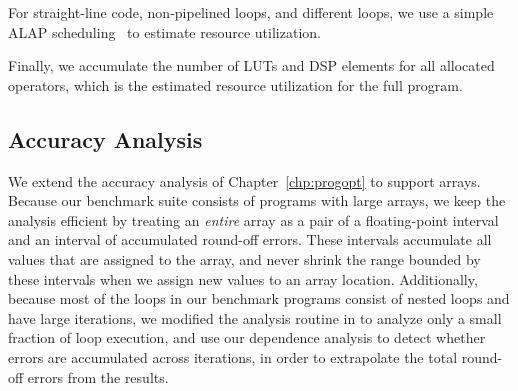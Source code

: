 For straight-line code, non-pipelined loops, and different loops, we use a
simple ALAP scheduling~\cite{wang_hls} to estimate resource utilization.

Finally, we accumulate the number of LUTs and DSP elements for all allocated
operators, which is the estimated resource utilization for the full program.


\subsection{Accuracy Analysis}
\label{sub:accuracy_analysis}

We extend the accuracy analysis of Chapter~\ref{chp:progopt} to support
arrays. Because our benchmark suite consists of programs with large arrays,
we keep the analysis efficient by treating an \emph{entire} array as a pair
of a floating-point interval and an interval of accumulated round-off errors.
These intervals accumulate all values that are assigned to the array, and
never shrink the range bounded by these intervals when we assign new values to
an array location.  Additionally, because most of the loops in our benchmark
programs consist of nested loops and have large iterations, we modified the
analysis routine in \SOAP{} to analyze only a small fraction of loop execution,
and use our dependence analysis to detect whether errors are accumulated
across iterations, in order to extrapolate the total round-off errors from the
results.


